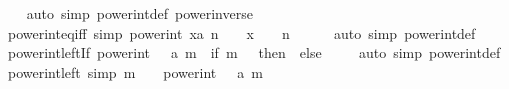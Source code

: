 \begin{isabellebody}
%
\isadelimproof
\ \ %
\endisadelimproof
%
\isatagproof
{}\isamarkupfalse%
\ {\isacharparenleft}{\kern0pt}auto\ simp{\isacharcolon}{\kern0pt}\ power{\isacharunderscore}{\kern0pt}int{\isacharunderscore}{\kern0pt}def\ power{\isacharunderscore}{\kern0pt}inverse{\isacharparenright}{\kern0pt}%
\endisatagproof
{\isafoldproof}%
%
\isadelimproof
\isanewline
%
\endisadelimproof
\isanewline
{}\isamarkupfalse%
\ power{\isacharunderscore}{\kern0pt}int{\isacharunderscore}{\kern0pt}eq{\isacharunderscore}{\kern0pt}{}{\isacharunderscore}{\kern0pt}iff\ {\isacharbrackleft}{\kern0pt}simp{\isacharbrackright}{\kern0pt}{\isacharcolon}{\kern0pt}\ {\isachardoublequoteopen}power{\isacharunderscore}{\kern0pt}int\ {\isacharparenleft}{\kern0pt}x{\isacharcolon}{\kern0pt}{\isacharcolon}{\kern0pt}{\isacharprime}{\kern0pt}a{\isacharparenright}{\kern0pt}\ n\ {\isacharequal}{\kern0pt}\ {}\ {\isasymlongleftrightarrow}\ x\ {\isacharequal}{\kern0pt}\ {}\ {\isasymand}\ n\ {\isasymnoteq}\ {}{\isachardoublequoteclose}\isanewline
%
\isadelimproof
\ \ %
\endisadelimproof
%
\isatagproof
{}\isamarkupfalse%
\ {\isacharparenleft}{\kern0pt}auto\ simp{\isacharcolon}{\kern0pt}\ power{\isacharunderscore}{\kern0pt}int{\isacharunderscore}{\kern0pt}def{\isacharparenright}{\kern0pt}%
\endisatagproof
{\isafoldproof}%
%
\isadelimproof
\isanewline
%
\endisadelimproof
\isanewline
{}\isamarkupfalse%
\ power{\isacharunderscore}{\kern0pt}int{\isacharunderscore}{\kern0pt}{}{\isacharunderscore}{\kern0pt}left{\isacharunderscore}{\kern0pt}If{\isacharcolon}{\kern0pt}\ {\isachardoublequoteopen}power{\isacharunderscore}{\kern0pt}int\ {\isacharparenleft}{\kern0pt}{}\ {\isacharcolon}{\kern0pt}{\isacharcolon}{\kern0pt}\ {\isacharprime}{\kern0pt}a{\isacharparenright}{\kern0pt}\ m\ {\isacharequal}{\kern0pt}\ {\isacharparenleft}{\kern0pt}if\ m\ {\isacharequal}{\kern0pt}\ {}\ then\ {}\ else\ {}{\isacharparenright}{\kern0pt}{\isachardoublequoteclose}\isanewline
%
\isadelimproof
\ \ %
\endisadelimproof
%
\isatagproof
{}\isamarkupfalse%
\ {\isacharparenleft}{\kern0pt}auto\ simp{\isacharcolon}{\kern0pt}\ power{\isacharunderscore}{\kern0pt}int{\isacharunderscore}{\kern0pt}def{\isacharparenright}{\kern0pt}%
\endisatagproof
{\isafoldproof}%
%
\isadelimproof
\isanewline
%
\endisadelimproof
\isanewline
{}\isamarkupfalse%
\ power{\isacharunderscore}{\kern0pt}int{\isacharunderscore}{\kern0pt}{}{\isacharunderscore}{\kern0pt}left\ {\isacharbrackleft}{\kern0pt}simp{\isacharbrackright}{\kern0pt}{\isacharcolon}{\kern0pt}\ {\isachardoublequoteopen}m\ {\isasymnoteq}\ {}\ {\isasymLongrightarrow}\ power{\isacharunderscore}{\kern0pt}int\ {\isacharparenleft}{\kern0pt}{}\ {\isacharcolon}{\kern0pt}{\isacharcolon}{\kern0pt}\ {\isacharprime}{\kern0pt}a{\isacharparenright}{\kern0pt}\ m\ {\isacharequal}{\kern0pt}\ {}{\isachardoublequoteclose}\isanewline

\end{isabellebody}
